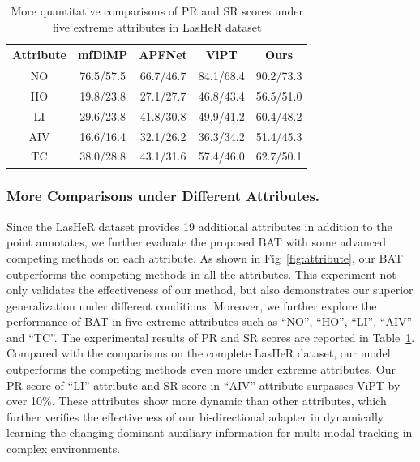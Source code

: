 \documentclass[letterpaper]{article} %
\begin{document}
\begin{table}[t]
\caption{More quantitative comparisons of PR and SR scores under five extreme attributes in LasHeR dataset}
\label{tab:attribute}
\centering
\begin{tabular}{ccccc}
\toprule
Attribute&mfDiMP&APFNet&ViPT&Ours \\
\midrule
 NO&76.5/57.5&66.7/46.7&84.1/68.4&90.2/73.3 \\
 HO&19.8/23.8&27.1/27.7&46.8/43.4&56.5/51.0 \\
 LI&29.6/23.8&41.8/30.8&49.9/41.2&60.4/48.2  \\
 AIV&16.6/16.4& 32.1/26.2&36.3/34.2&51.4/45.3  \\
 TC&38.0/28.8& 43.1/31.6& 57.4/46.0&62.7/50.1 \\
\bottomrule
\end{tabular}
\end{table}

\subsubsection{More Comparisons under Different Attributes.}
Since the LasHeR dataset provides 19 additional attributes 
in addition to the point annotates, we further evaluate the proposed BAT with some advanced competing methods on each attribute. As shown in Fig~\ref{fig:attribute}, our BAT outperforms the competing methods in all the attributes. This experiment not only validates the effectiveness of our method, but also demonstrates our superior generalization under different conditions. Moreover, we further explore the performance of BAT in five extreme attributes such as ``NO'', ``HO'', ``LI'', ``AIV'' and ``TC''. The experimental results of PR and SR scores are reported in Table~\ref{tab:attribute}. Compared with the comparisons on the complete LasHeR dataset, our model outperforms the competing methods even more under extreme attributes. Our PR score of ``LI'' attribute and SR score in ``AIV'' attribute  surpasses ViPT by over 10\%. These attributes show more dynamic than other attributes, which further verifies the effectiveness of our bi-directional adapter in dynamically learning the changing dominant-auxiliary information for multi-modal tracking in complex environments.
\end{document}

